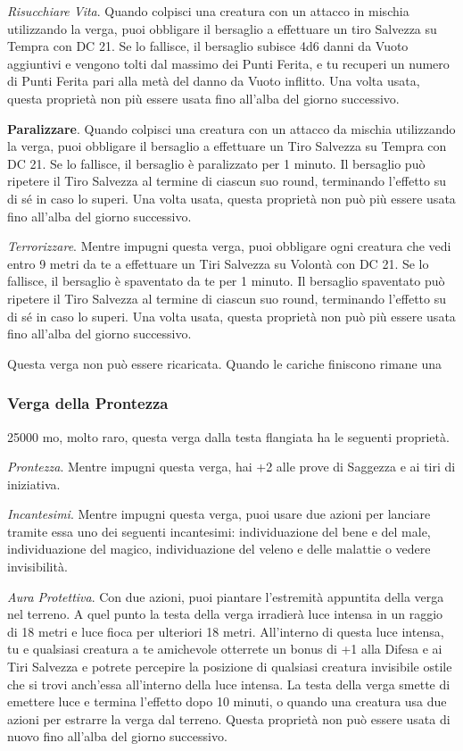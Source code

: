\begin{multicols}{2}
\textit{Risucchiare Vita}. Quando colpisci una creatura con un attacco in mischia utilizzando la verga, puoi obbligare il bersaglio a effettuare un tiro Salvezza su Tempra con DC 21. Se lo fallisce, il bersaglio subisce 4d6 danni da Vuoto aggiuntivi e vengono tolti dal massimo dei Punti Ferita, e tu recuperi un numero di Punti Ferita pari alla metà del danno da Vuoto inflitto. Una volta usata, questa proprietà non più essere usata fino all'alba del giorno successivo.

\textbf{Paralizzare}. Quando colpisci una creatura con un attacco da mischia utilizzando la verga, puoi obbligare il bersaglio a effettuare un Tiro Salvezza su Tempra con DC 21. Se lo fallisce, il bersaglio è paralizzato per 1 minuto. Il bersaglio può ripetere il Tiro Salvezza al termine di ciascun suo round, terminando l'effetto su di sé in caso lo superi. Una volta usata, questa proprietà non può più essere usata fino all'alba del giorno successivo.

\textit{Terrorizzare}. Mentre impugni questa verga, puoi obbligare ogni creatura che vedi entro 9 metri da te a effettuare un Tiri Salvezza su Volontà con DC 21. Se lo fallisce, il bersaglio è spaventato da te per 1 minuto. Il bersaglio spaventato può ripetere il Tiro Salvezza al termine di ciascun suo round, terminando l'effetto su di sé in caso lo superi. Una volta usata, questa proprietà non può più essere usata fino all'alba del giorno successivo.

Questa verga non può essere ricaricata. Quando le cariche finiscono rimane una

\subsubsection*{Verga della Prontezza}
25000 mo, molto raro, questa verga dalla testa flangiata ha le seguenti proprietà.

\textit{Prontezza}. Mentre impugni questa verga, hai +2 alle prove di Saggezza e ai tiri di iniziativa.

\textit{Incantesimi}. Mentre impugni questa verga, puoi usare due azioni per lanciare tramite essa uno dei seguenti incantesimi: individuazione del bene e del male, individuazione del magico, individuazione del veleno e delle malattie o vedere invisibilità.

\textit{Aura Protettiva}. Con due azioni, puoi piantare l'estremità appuntita della verga nel terreno. A quel punto la testa della verga irradierà luce intensa in un raggio di 18 metri e luce fioca per ulteriori 18 metri. All'interno di questa luce intensa, tu e qualsiasi creatura a te amichevole otterrete un bonus di +1 alla Difesa e ai Tiri Salvezza e potrete percepire la posizione di qualsiasi creatura invisibile ostile che si trovi anch'essa all'interno della luce intensa. La testa della verga smette di emettere luce e termina l'effetto dopo 10 minuti, o quando una creatura usa due azioni per estrarre la verga dal terreno. Questa proprietà non può essere usata di nuovo fino all'alba del giorno successivo.


\end{multicols}
